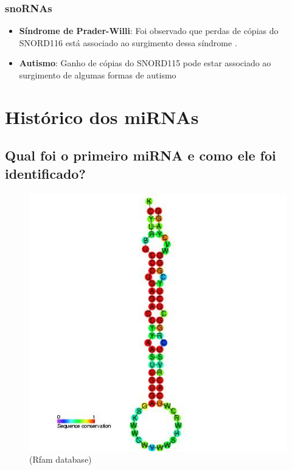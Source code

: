 \documentclass[
]{book}
\begin{document}
\hypertarget{snornas-2}{%
\subsection{snoRNAs}\label{snornas-2}}

\begin{itemize}
\item
  \textbf{Síndrome de Prader-Willi}: Foi observado que perdas de cópias do SNORD116 está associado ao surgimento dessa síndrome \citep{Sahoo_2008}.
\item
  \textbf{Autismo}: Ganho de cópias do SNORD115 pode estar associado ao surgimento de algumas formas de autismo \citep{Bolton_2004}
\end{itemize}

\hypertarget{histuxf3rico-dos-mirnas}{%
\chapter{Histórico dos miRNAs}\label{histuxf3rico-dos-mirnas}}

\hypertarget{qual-foi-o-primeiro-mirna-e-como-ele-foi-identificado}{%
\section{Qual foi o primeiro miRNA e como ele foi identificado?}\label{qual-foi-o-primeiro-mirna-e-como-ele-foi-identificado}}

\begin{figure}
\centering
\includegraphics{./pics/lin4.jpg}
\caption{(Rfam database)}
\end{figure}
\end{document}
